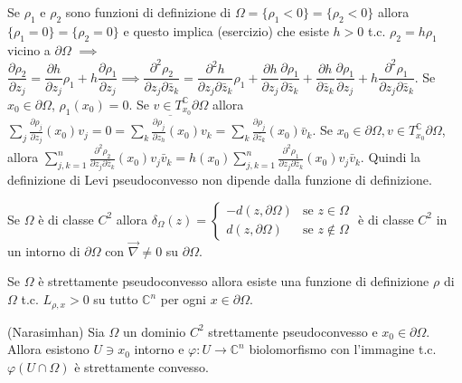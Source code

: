 \begin{oss}
  Se $\rho_1$ e $\rho_2$ sono funzioni di definizione di $\Omega=\{\rho_1<0\}=\{\rho_2<0\}$ allora $\{\rho_1=0\}=\{\rho_2=0\}$ e questo implica (esercizio) che esiste $h>0$ t.c. $\rho_2=h\rho_1$ vicino a $\partial\Omega$ $\implies$
  $\dfrac{\partial\rho_2}{\partial z_j}=\dfrac{\partial h}{\partial z_j}\rho_1+h\dfrac{\partial\rho_1}{\partial z_j} \implies \dfrac{\partial^2\rho_2}{\partial z_j\partial\bar{z}_k}=\dfrac{\partial^2h}{\partial z_j\partial\bar{z}_k}\rho_1+\dfrac{\partial h}{\partial z_j}\dfrac{\partial\rho_1}{\partial\bar{z}_k}+\dfrac{\partial h}{\partial\bar{z}_k}\dfrac{\partial\rho_1}{\partial z_j}+h\dfrac{\partial^2\rho_1}{\partial z_j\partial\bar{z}_k}$.
  Se $x_0 \in \partial\Omega$, $\rho_1(x_0)=0$. Se $v \in T_{x_0}^{\mathbb{C}}\partial\Omega$ allora $\displaystyle \sum_j \frac{\partial\rho_j}{\partial z_j}(x_0)v_j=0=\overline{\sum_k\frac{\partial\rho_j}{\partial z_h}(x_0)v_k}=\sum_k\frac{\partial\rho_j}{\partial\bar{z}_k}(x_0)\bar{v}_k$.
  Se $x_0 \in \partial\Omega, v \in T_{x_0}^{\mathbb{C}}\partial\Omega$, allora $\displaystyle \sum_{j,k=1}^n \frac{\partial^2\rho_2}{\partial z_j\partial\bar{z}_k}(x_0)v_j\bar{v}_k=h(x_0)\sum_{j,k=1}^n \frac{\partial^2\rho_1}{\partial z_j\partial\bar{z}_k}(x_0)v_j\bar{v}_k$.
  Quindi la definizione di Levi pseudoconvesso non dipende dalla funzione di definizione.
\end{oss}

\begin{ftt}
  Se $\Omega$ è di classe $C^2$ allora $\delta_{\Omega}(z)=\begin{cases} -d(z,\partial\Omega) & \mbox{se }z \in \Omega \\ d(z, \partial\Omega) & \mbox{se }z \not\in \Omega \end{cases}$ è di classe $C^2$ in un intorno di $\partial\Omega$ con $\vec{\nabla}\not=0$ su $\partial\Omega$.
\end{ftt}

\begin{ftt}
  Se $\Omega$ è strettamente pseudoconvesso allora esiste una funzione di definizione $\rho$ di $\Omega$ t.c. $L_{\rho,x}>0$ su tutto $\mathbb{C}^n$ per ogni $x \in \partial\Omega$.
\end{ftt}

\begin{ftt}
  (Narasimhan) Sia $\Omega$ un dominio $C^2$ strettamente pseudoconvesso e $x_0 \in \partial\Omega$. Allora esistono $U \ni x_0$ intorno e $\varphi:U \longrightarrow \mathbb{C}^n$ biolomorfismo con l'immagine t.c. $\varphi(U \cap \Omega)$ è strettamente convesso.
\end{ftt}

